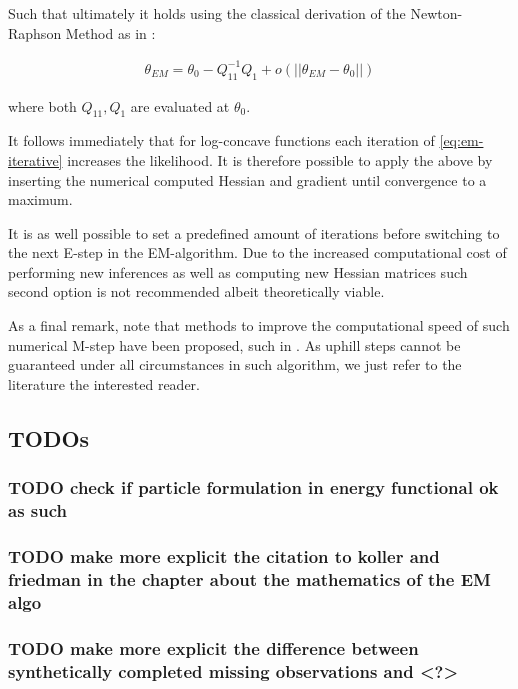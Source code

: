 \documentclass[11pt]{article}
\begin{document}
Such that ultimately it holds using the classical derivation of the
Newton-Raphson Method as in \cite{storvik2007numerical}:


\begin{align} 
 \theta_{EM}  = \theta_{0} - Q_{11}^{-1} Q_1 + o(||\theta_{EM} - \theta_{0}||) \label{eq:em-iterative}
\end{align}

where both \(Q_{11}, Q_{1}\) are evaluated at \(\theta_0\).

It follows immediately that for log-concave functions each iteration
of \ref{eq:em-iterative} increases the likelihood. It is therefore
possible to apply the above by inserting the numerical computed
Hessian and gradient until convergence to a maximum.

It is as well possible to set a predefined amount of iterations
before switching to the next E-step in the EM-algorithm. Due to the
increased computational cost of performing new inferences as well as
computing new Hessian matrices such second option is not
recommended albeit theoretically viable.

As a final remark, note that methods to improve the computational
speed of such numerical M-step have been proposed, such in
\cite{Louis_1982}. As uphill steps cannot be guaranteed under all
circumstances in such algorithm, we just refer to the literature the
interested reader.





\newpage





\subsection{TODOs}
\label{sec:org8c693f6}

\subsubsection{{\bfseries\sffamily TODO} check if particle formulation in energy functional ok as such}
\label{sec:org017e790}

\subsubsection{{\bfseries\sffamily TODO} make more explicit the citation to koller and friedman in the chapter about the mathematics of the EM algo}
\label{sec:org4a12739}

\subsubsection{{\bfseries\sffamily TODO} make more explicit the difference between synthetically completed missing observations and <?>}
\label{sec:org344f92a}
\end{document}

